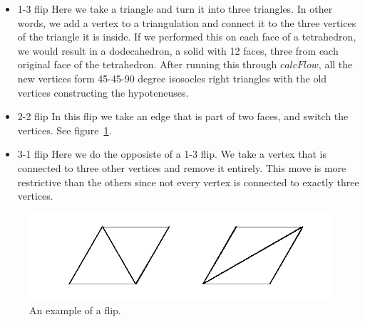 \documentclass[12pt]{article}
\begin{document}
\begin{itemize}
\item{1-3 flip}
Here we take a triangle and turn it into three triangles. In other words, we add a vertex to a triangulation and connect it to the three vertices of the triangle it is inside. If we performed this on each face of a tetrahedron, we would result in a dodecahedron, a solid with 12 faces, three from each original face of the tetrahedron. After running this through $calcFlow$, all the new vertices form 45-45-90 degree isosocles right triangles with the old vertices constructing the hypoteneuses. 
\item{2-2 flip}
In this flip we take an edge that is part of two faces, and switch the vertices. See figure~\ref{fig:flip}. 
\item{3-1 flip}
Here we do the opposiste of a 1-3 flip. We take a vertex that is connected to three other vertices and remove it entirely. This move is more restrictive than the others since not every vertex is connected to exactly three vertices. 
\end{itemize}
\begin{figure}
\centering
\includegraphics[scale = 1.0]{Flip.png}
\caption{An example of a flip.}
\label{fig:flip}
\end{figure}
  
\end{document}
